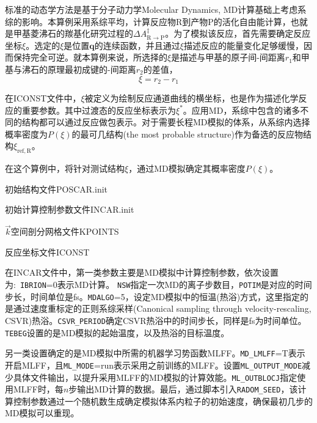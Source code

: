 标准的动态学方法是基于分子动力学\textrm{Molecular Dynamics, MD}计算基础上考虑系综的影响。本算例采用系综平均，计算反应物\textrm{R}到产物\textrm{P}的活化自由能计算，也就是甲基菱沸石的羰基化研究过程的$\Delta A_{\mathrm{R}\rightarrow\mathrm{P}}^{\ddagger}$。为了模拟该反应，首先需要确定反应坐标$\xi$。选定的$\xi$是位置$\mathbf{q}$的连续函数，并且通过$\xi$描述反应的能量变化足够缓慢，因而保持完全可逆。就本算例来说，所选择的$\xi$是描述与甲基的原子间-间距离$r_1$和甲基与沸石的原理最初成键的-间距离$r_2$的差值，
\begin{displaymath}
	\xi=r_2-r_1
\end{displaymath}

在\textrm{ICONST}文件中，$\xi$被定义为绘制反应通道曲线的横坐标，也是作为描述化学反应的重要参数。其中过渡态的反应坐标表示为$\xi^{\ast}$。应用\textrm{MD}，系综中包含的诸多不同的结构都可以通过反应做包表示。对于需要长程\textrm{MD}模拟的体系，从系综内选择概率密度为$P(\xi)$的最可几结构\textrm{(the most probable structure)}作为备选的反应物结构$\xi_{\mathrm{ref},\mathrm{R}}$。%

在这个算例中，将针对测试结构$\xi$，通过\textrm{MD}模拟确定其概率密度$P(\xi)$。

初始结构文件\textrm{POSCAR.init}

初始计算控制参数文件\textrm{INCAR.init}

$\vec k$空间剖分网格文件\textrm{KPOINTS}

反应坐标文件\textrm{ICONST}

在\textrm{INCAR}文件中，第一类参数主要是\textrm{MD}模拟中计算控制参数，依次设置为:~\texttt{IBRION}=0表示\textrm{MD}计算。%
\texttt{NSW}指定一次\textrm{MD}的离子步数目，\texttt{POTIM}是对应的时间步长，时间单位是\textrm{fs}。\texttt{MDALGO}=5，设定\textrm{MD}模拟中的恒温(热浴)方式，这里指定的是通过速度重标定的正则系综采样\textrm{(Canonical sampling through velocity-rescaling, CSVR)}热浴。\texttt{CSVR\_PERIOD}确定\textrm{CSVR}热浴中的时间步长，同样是\textrm{fs}为时间单位。\texttt{TEBEG}设置的是\textrm{MD}模拟的起始温度，以及热浴的目标温度。

另一类设置确定的是\textrm{MD}模拟中所需的机器学习势函数\textrm{MLFF}。\texttt{MD\_LMLFF}=\textrm{T}表示开启\textrm{MLFF}，且\texttt{ML\_MODE}=\textrm{run}表示采用之前训练的\textrm{MLFF}。设置\texttt{ML\_OUTPUT\_MODE}减少具体文件输出，以提升采用\textrm{MLFF}的\textrm{MD}模拟的计算效能。\texttt{ML\_OUTBLOCJ}指定使用\textrm{MLFF}时，每$n$步输出\textrm{MD}计算的数据。最后，通过脚本引入\texttt{RADOM\_SEED}，该计算控制参数通过一个随机数生成确定模拟体系内粒子的初始速度，确保最初几步的\textrm{MD}模拟可以重现。


